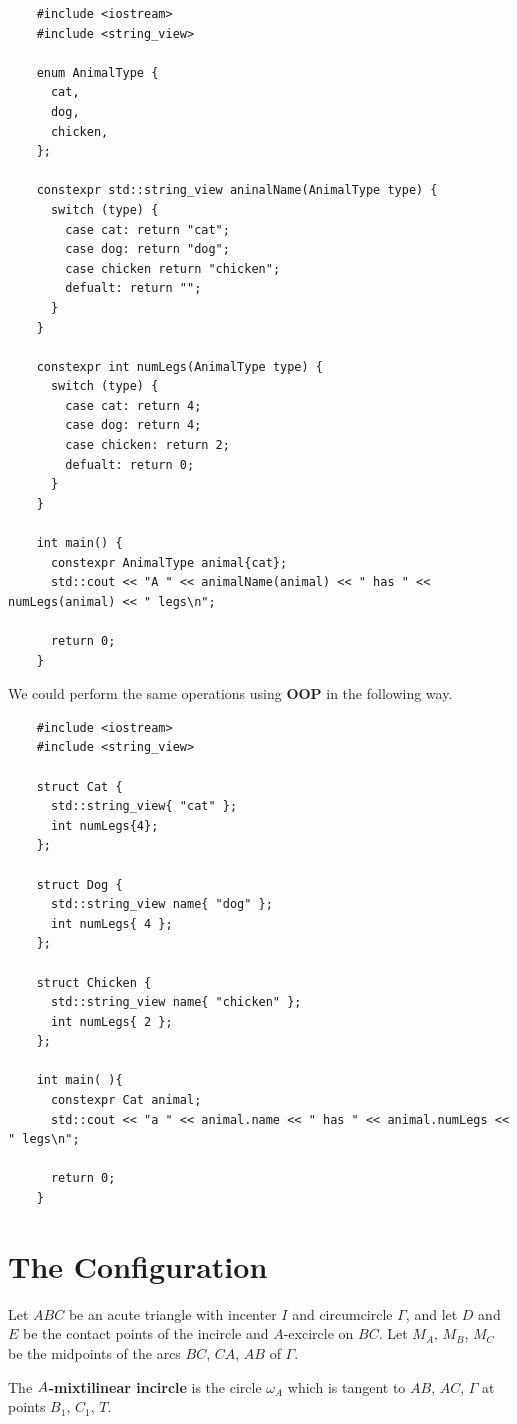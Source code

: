 \documentclass[11pt]{scrartcl}
\begin{document}
\begin{code}
  \begin{lstlisting}
    #include <iostream>
    #include <string_view>

    enum AnimalType {
      cat,
      dog,
      chicken,
    };

    constexpr std::string_view aninalName(AnimalType type) {
      switch (type) {
        case cat: return "cat";
        case dog: return "dog";
        case chicken return "chicken";
        defualt: return "";
      }
    }

    constexpr int numLegs(AnimalType type) {
      switch (type) {
        case cat: return 4;
        case dog: return 4;
        case chicken: return 2;
        defualt: return 0;
      }
    }

    int main() {
      constexpr AnimalType animal{cat};
      std::cout << "A " << animalName(animal) << " has " << numLegs(animal) << " legs\n";

      return 0;
    }

  \end{lstlisting}
\end{code}

We could perform the same operations using \textbf{OOP} in the following way.

\begin{code}
  \begin{lstlisting}
    #include <iostream>
    #include <string_view>

    struct Cat {
      std::string_view{ "cat" };
      int numLegs{4};
    };

    struct Dog {
      std::string_view name{ "dog" };
      int numLegs{ 4 };
    };

    struct Chicken {
      std::string_view name{ "chicken" };
      int numLegs{ 2 };
    };

    int main( ){
      constexpr Cat animal;
      std::cout << "a " << animal.name << " has " << animal.numLegs << " legs\n";

      return 0;
    }
  \end{lstlisting}
\end{code}

\section{The Configuration}
\begin{mdframed}
  Let $ABC$ be an acute triangle with incenter $I$ and circumcircle $\Gamma$,
  and let $D$ and $E$ be the contact points of the incircle and $A$-excircle on $BC$.
  Let $M_A$, $M_B$, $M_C$ be the midpoints of the arcs $BC$, $CA$, $AB$ of $\Gamma$.

  The \textbf{$\boldmath A$-mixtilinear incircle} is the circle $\omega_A$ which is
  tangent to $AB$, $AC$, $\Gamma$ at points $B_1$, $C_1$, $T$.
\end{mdframed}
\end{document}
